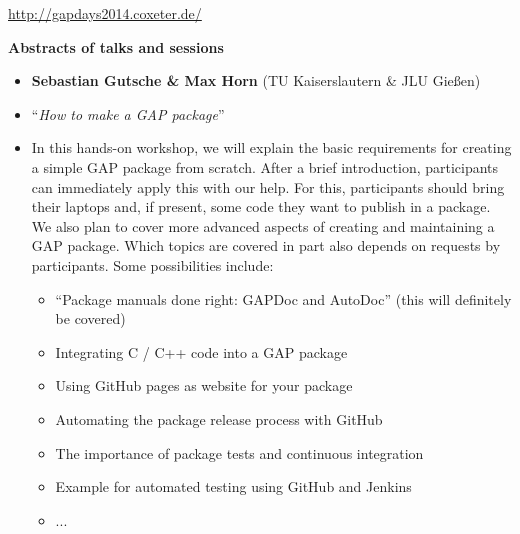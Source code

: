 \documentclass[11pt,a4paper]{article}
\begin{document}
\vfill

\begin{center}
  \url{http://gapdays2014.coxeter.de/}
\end{center}


\pagebreak


\newenvironment{Abstract}[3]{\begin{itemize}[itemsep=0mm,label={}]
  \item \textbf{#1} (#2)
  \item ``\textit{#3}''
  \item}{\end{itemize}\medskip}


{\noindent\huge\textbf{Abstracts of talks and sessions}} \\[1em]

\begin{Abstract}{Sebastian Gutsche \& Max Horn}{TU Kaiserslautern \& JLU Gießen}{How to make a GAP package}

In this hands-on workshop, we will explain the basic requirements for
creating a simple GAP package from scratch. After a brief introduction,
participants can immediately apply this with our help. For this,
participants should bring their laptops and, if present, some code they
want to publish in a package.
%
We also plan to cover more advanced aspects of creating and maintaining
a GAP package.  Which topics are covered in part also depends on requests
by participants. Some possibilities include:
\begin{itemize}[itemsep=0mm]
\item ``Package manuals done right: GAPDoc and AutoDoc'' (this will definitely be covered)
\item Integrating C / C++ code into a GAP package
\item Using GitHub pages as website for your package
\item Automating the package release process with GitHub
\item The importance of package tests and continuous integration
\item Example for automated testing using GitHub and Jenkins
\item ...
\end{itemize}

\end{Abstract}
\end{document}
